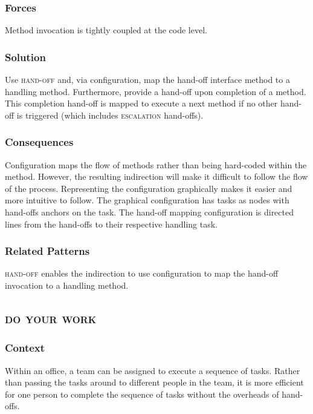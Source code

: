 \documentclass[prodmode]{style/acmlarge}
\begin{document}
\subsubsection*{Forces} Method invocation is tightly coupled at the code level.

\subsubsection*{\textbf{Solution}} Use \textsc{hand-off} and, via configuration,
map the hand-off interface method to a handling method.  Furthermore, provide a
hand-off upon completion of a method.  This completion hand-off is mapped to
execute a next method if no other hand-off is triggered (which includes
\textsc{escalation} hand-offs).

\subsubsection*{Consequences} Configuration maps the flow of methods rather than
being hard-coded within the method.  However, the resulting indirection will
make it difficult to follow the flow of the process.  Representing the
configuration graphically makes it easier and more intuitive to follow.  The
graphical configuration has tasks as nodes with hand-offs anchors on the task. 
The hand-off mapping configuration is directed lines from the hand-offs to their
respective handling task.

\subsubsection*{Related Patterns} \textsc{hand-off} enables the indirection to
use configuration to map the hand-off invocation to a handling method.




\subsection{\textsc{\textbf{do your work}}}

\subsubsection*{Context} Within an office, a team can be assigned to execute a
sequence of tasks.  Rather than passing the tasks around to different people in
the team, it is more efficient for one person to complete the sequence of tasks
without the overheads of hand-offs.
\end{document}
